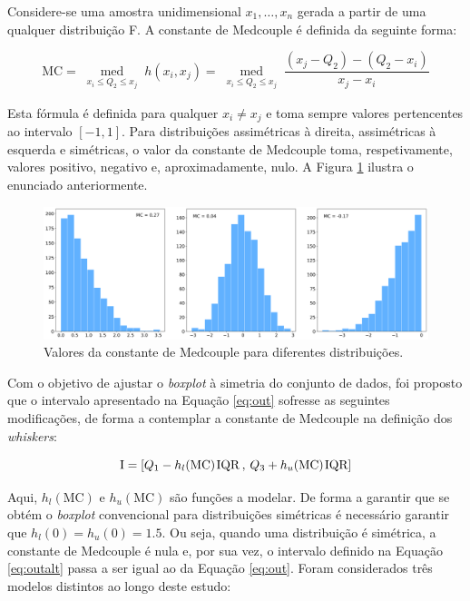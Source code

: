 Considere-se uma amostra unidimensional ${x_1, \dots, x_n}$ gerada a partir de uma qualquer distribuição F. A constante de Medcouple é definida da seguinte forma:


\begin{equation}
	\text{MC} = \operatorname*{med}_{\substack{x_i \leq Q_2 \leq x_j}} h(x_i, x_j) = \operatorname*{med}_{\substack{x_i \leq Q_2 \leq x_j}} \frac{(x_j - Q_2) - (Q_2 - x_i)}{x_j - x_i}
\end{equation}

Esta fórmula é definida para qualquer $x_i \neq x_j$ e toma sempre valores pertencentes ao intervalo $[-1,1]$. Para distribuições assimétricas à direita, assimétricas à esquerda e simétricas, o valor da constante de Medcouple toma, respetivamente, valores positivo, negativo e, aproximadamente, nulo. A Figura \ref{fig:histmc} ilustra o enunciado anteriormente.

\begin{figure}[H]
	\centering
	\includegraphics[width=\textwidth]{imagens/stats/histos_mc.png}
	\caption{Valores da constante de Medcouple para diferentes distribuições.}
	\label{fig:histmc}
\end{figure}


Com o objetivo de ajustar o \textit{boxplot} à simetria do conjunto de dados, foi proposto que o intervalo apresentado na Equação \ref{eq:out} sofresse as seguintes modificações, de forma a contemplar a constante de Medcouple na definição dos \textit{whiskers}:


\begin{equation}
	\text{I} = [Q_1 - h_l(\text{MC}) \hspace{1px} \text{IQR} \hspace{2px} , \hspace{2px} Q_3 + h_u(\text{MC}) \hspace{1px} \text{IQR}]
	\label{eq:outalt}
\end{equation}


Aqui, $h_l(\text{MC})$ e $h_u(\text{MC})$ são funções a modelar. De forma a garantir que se obtém o \textit{boxplot} convencional para distribuições simétricas é necessário garantir que $h_l(0) = h_u(0) = 1.5$. Ou seja, quando uma distribuição é simétrica, a constante de Medcouple é nula e, por sua vez, o intervalo definido na Equação \ref{eq:outalt} passa a ser igual ao da Equação \ref{eq:out}. Foram considerados três modelos distintos ao longo deste estudo:

